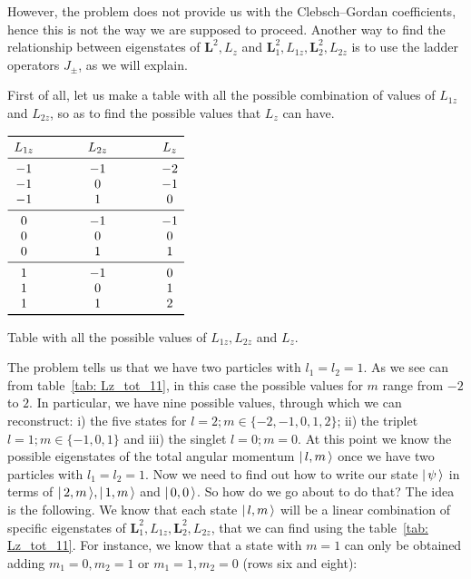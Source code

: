 However, the problem does not provide us with the Clebsch--Gordan coefficients, hence this is not the way we are supposed to proceed. Another way to find the relationship between eigenstates of $\bm{L}^2, L_z$ and $\bm{L}_1^2, L_{1z}, \bm{L}_2^2, L_{2z}$ is to use the ladder operators $J_\pm$, as we will explain.

First of all, let us make a table with all the possible combination of values of $L_{1z}$ and $L_{2z}$, so as to find the possible values that $L_z$ can have.
\begin{table}
    \centering
    $\begin{array}{c@{\hspace{1.5cm}}c@{\hspace{1.5cm}}c}
        \toprule
        L_{1z} & L_{2z} & L_z \\
        \midrule
        -1 & -1 & -2 \\
        -1 & 0 & -1 \\
        -1 & 1 & 0 \\
        \midrule
        0 & -1 & -1 \\
        0 & 0 & 0 \\
        0 & 1 & 1 \\
        \midrule
        1 & -1 & 0 \\
        1 & 0 & 1 \\
        1 & 1 & 2 \\
        \bottomrule
    \end{array}$   
    \caption{Table with all the possible values of $L_{1z}, L_{2z}$ and $L_z$.}   
    \label{tab: Lz_tot_11} 
\end{table}
The problem tells us that we have two particles with $l_1 = l_2 = 1$. As we see can from table~\ref{tab: Lz_tot_11}, in this case the possible values for $m$ range from $-2$ to $2$. In particular, we have nine possible values, through which we can reconstruct: i) the five states for $l=2; m \in \{-2, -1, 0, 1, 2 \}$; ii) the triplet $l=1; m \in \{-1, 0, 1 \}$ and iii) the singlet $l=0; m=0$.
At this point we know the possible eigenstates of the total angular momentum $| \, l, m \, \rangle$ once we have two particles with $l_1 = l_2 = 1$. Now we need to find out how to write our state $| \, \psi \, \rangle$ in terms of $| \, 2, m \, \rangle, | \, 1, m \, \rangle$ and $| \, 0, 0 \, \rangle$. So how do we go about to do that? The idea is the following. We know that each state $| \, l, m \, \rangle$ will be a linear combination of specific eigenstates of $\bm{L}_1^2, L_{1z}, \bm{L}_2^2, L_{2z}$, that we can find using the table~\ref{tab: Lz_tot_11}. For instance, we know that a state with $m=1$ can only be obtained adding $m_1=0, m_2=1$ or $m_1=1, m_2=0$ (rows six and eight):
